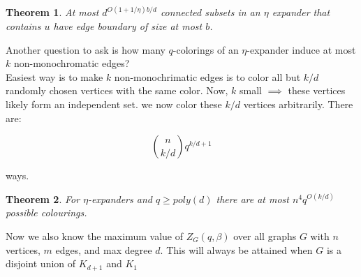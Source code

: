 \documentclass{article}
\newtheorem{theorem}{Theorem}
\begin{document}
\begin{theorem}
    At most $d^{O(1+1/\eta)b/d}$ connected subsets in an $\eta$ expander that contains $u$ have edge boundary of size at most $b$.
\end{theorem}

\noindent Another question to ask is how many $q$-colorings of an $\eta$-expander induce at most $k$ non-monochromatic edges?\\

\noindent  Easiest way is to make $k$ non-monochrimatic edges is to color all but $k/d$ randomly chosen vertices with the same color. Now, $k$ small $\implies$ these vertices likely form an independent set. we now color these $k/d$ vertices arbitrarily. There are:

\begin{equation*}
    {n \choose k/d} q^{k/d+1}
\end{equation*}

\noindent ways.

\begin{theorem}
    For $\eta$-expanders and $q \geq poly(d)$ there are at most $n^4 q^{O(k/d)}$ possible colourings.
\end{theorem}

\noindent Now we also know the maximum value of $Z_G(q,\beta)$ over all graphs $G$ with $n$ vertices, $m$ edges, and max degree $d$. This will always be attained when $G$ is a disjoint union of $K_{d+1}$ and $K_1$

\newpage

\end{document}
